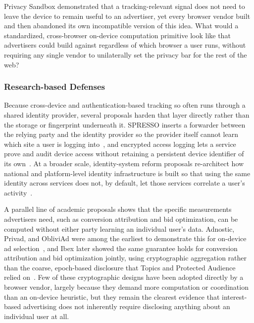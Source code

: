 \begin{opbox}
Privacy Sandbox demonstrated that a tracking-relevant signal does not need to leave the device to remain useful to an advertiser, yet every browser vendor built and then abandoned its own incompatible version of this idea. What would a standardized, cross-browser on-device computation primitive look like that advertisers could build against regardless of which browser a user runs, without requiring any single vendor to unilaterally set the privacy bar for the rest of the web?
\end{opbox}


\subsubsection{Research-based Defenses}
\label{sec:mixed-defenses-research}



%
Because cross-device and authentication-based tracking so often runs through a shared identity provider, several proposals harden that layer directly rather than the storage or fingerprint underneath it.
%
SPRESSO inserts a forwarder between the relying party and the identity provider so the provider itself cannot learn which site a user is logging into~\cite{fettSPRESSOSecurePrivacyRespecting2015}, and encrypted access logging lets a service prove and audit device access without retaining a persistent device identifier of its own~\cite{ortegaperezEncryptedAccessLogging2025}.
%
At a broader scale, identity-system reform proposals re-architect how national and platform-level identity infrastructure is built so that using the same identity across services does not, by default, let those services correlate a user's activity~\cite{brandaoMendingTwoNationScale2015}.


%
A parallel line of academic proposals shows that the specific measurements advertisers need, such as conversion attribution and bid optimization, can be computed without either party learning an individual user's data.
%
Adnostic, Privad, and ObliviAd were among the earliest to demonstrate this for on-device ad selection~\cite{toubianaAdnosticPrivacyPreserving2010,guhaPrivadPracticalPrivacy2011,backesObliviAdProvablySecure2012}, and Ibex later showed the same guarantee holds for conversion attribution and bid optimization jointly, using cryptographic aggregation rather than the coarse, epoch-based disclosure that Topics and Protected Audience relied on~\cite{zhongIbexPrivacypreservingAd2022}.
%
Few of these cryptographic designs have been adopted directly by a browser vendor, largely because they demand more computation or coordination than an on-device heuristic, but they remain the clearest evidence that interest-based advertising does not inherently require disclosing anything about an individual user at all.


